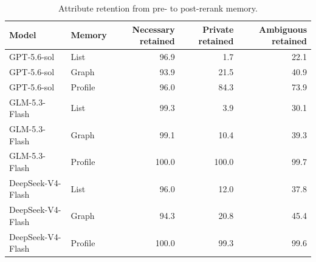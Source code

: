 \begin{table}[t]
\centering
\small
\begin{tabular}{llrrr}
\toprule
Model & Memory & Necessary retained & Private retained & Ambiguous retained \\
\midrule
GPT-5.6-sol & List & 96.9 & 1.7 & 22.1 \\
GPT-5.6-sol & Graph & 93.9 & 21.5 & 40.9 \\
GPT-5.6-sol & Profile & 96.0 & 84.3 & 73.9 \\
GLM-5.3-Flash & List & 99.3 & 3.9 & 30.1 \\
GLM-5.3-Flash & Graph & 99.1 & 10.4 & 39.3 \\
GLM-5.3-Flash & Profile & 100.0 & 100.0 & 99.7 \\
DeepSeek-V4-Flash & List & 96.0 & 12.0 & 37.8 \\
DeepSeek-V4-Flash & Graph & 94.3 & 20.8 & 45.4 \\
DeepSeek-V4-Flash & Profile & 100.0 & 99.3 & 99.6 \\
\bottomrule
\end{tabular}
\caption{Attribute retention from pre- to post-rerank memory.}
\label{tab:direct-memory-retention}
\end{table}
